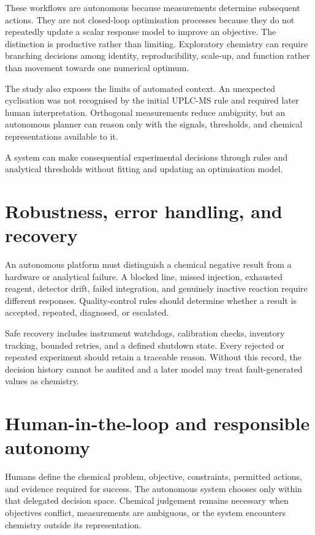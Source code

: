 These workflows are autonomous because measurements determine subsequent actions.
They are not closed-loop optimisation processes because they do not repeatedly update a scalar response model to improve an objective.
The distinction is productive rather than limiting.
Exploratory chemistry can require branching decisions among identity, reproducibility, scale-up, and function rather than movement towards one numerical optimum.

The study also exposes the limits of automated context.
An unexpected cyclisation was not recognised by the initial UPLC-MS rule and required later human interpretation.
Orthogonal measurements reduce ambiguity, but an autonomous planner can reason only with the signals, thresholds, and chemical representations available to it.

\begin{warningbox}
  A system can make consequential experimental decisions through rules and analytical thresholds without fitting and updating an optimisation model.
\end{warningbox}

\section{Robustness, error handling, and recovery}

An autonomous platform must distinguish a chemical negative result from a hardware or analytical failure.
A blocked line, missed injection, exhausted reagent, detector drift, failed integration, and genuinely inactive reaction require different responses.
Quality-control rules should determine whether a result is accepted, repeated, diagnosed, or escalated.

Safe recovery includes instrument watchdogs, calibration checks, inventory tracking, bounded retries, and a defined shutdown state.
Every rejected or repeated experiment should retain a traceable reason.
Without this record, the decision history cannot be audited and a later model may treat fault-generated values as chemistry.

\section{Human-in-the-loop and responsible autonomy}

Humans define the chemical problem, objective, constraints, permitted actions, and evidence required for success.
The autonomous system chooses only within that delegated decision space.
Chemical judgement remains necessary when objectives conflict, measurements are ambiguous, or the system encounters chemistry outside its representation.

